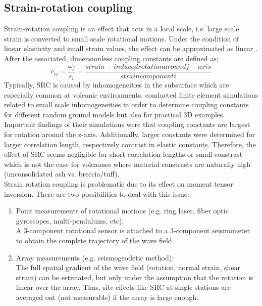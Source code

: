 \documentclass[12pt, a4paper]{article}
\begin{document}
\subsection*{Strain-rotation coupling}
Strain-rotation coupling is an effect that acts in a local scale, i.e. large scale strain is converted to small scale rotational motions. Under the condition of linear elasticity and small strain values, the effect can be approximated as linear \citep{vanDriel2012}. After \citet{Harrison1976} the associated, dimensionless coupling constants are defined as:
\begin{equation}
	c_{ij} = \frac{\omega_j}{\epsilon_i} = \frac{strain-induced rotation around j-axis}{strain component i}
\end{equation} 
Typically, SRC is caused by inhomogeneities in the subsurface which are especially common at volcanic environments. \citet{vanDriel2012} conducted finite element simulations related to small scale inhomogeneities in order to determine coupling constants for different random ground models but also for practical 3D examples.\\
Important findings of their simulations were that coupling constants are largest for rotation around the z-axis. Additionally, larger constants were determined for larger correlation length, respectively contrast in elastic constants. Therefore, the effect of SRC seems negligible for short correlation lengths or small constrast which is not the case for volcaones where material constrasts are naturally high (unconsolidated ash vs. breccia/tuff).\\
Strain rotation coupling is problematic due to its effect on moment tensor inversion. There are two possibilities to deal with this issue:
\begin{enumerate}
	\singlespacing
	\item Point measurements of rotational motions (e.g. ring laser, fiber optic gyroscopes, multi-pendulums, etc):\\
	A 3-component rotational sensor is attached to a 3-component seismometer to obtain the complete trajectory of the wave field.
	\item Array measurements (e.g. seismogeodetic method):\\
	The full spatial gradient of the wave field (rotation, normal strain, shear strain) can be estimated, but only under the assumption that the rotation is linear over the array. Thus, site effects like SRC at single stations are averaged out (not measurable) if the array is large enough.
\end{enumerate}
\end{document}
